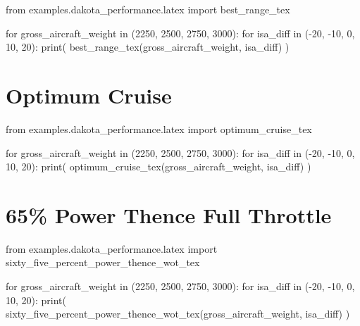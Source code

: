 \begin{pycode}
from examples.dakota_performance.latex import best_range_tex

for gross_aircraft_weight in (2250, 2500, 2750, 3000):
    for isa_diff in (-20, -10, 0, 10, 20):
        print(
            best_range_tex(gross_aircraft_weight, isa_diff)
        )
\end{pycode}

\section{Optimum Cruise}

\begin{pycode}
from examples.dakota_performance.latex import optimum_cruise_tex

for gross_aircraft_weight in (2250, 2500, 2750, 3000):
    for isa_diff in (-20, -10, 0, 10, 20):
        print(
            optimum_cruise_tex(gross_aircraft_weight, isa_diff)
        )
\end{pycode}

\section{65\% Power Thence Full Throttle}

\begin{pycode}
from examples.dakota_performance.latex import sixty_five_percent_power_thence_wot_tex

for gross_aircraft_weight in (2250, 2500, 2750, 3000):
    for isa_diff in (-20, -10, 0, 10, 20):
        print(
            sixty_five_percent_power_thence_wot_tex(gross_aircraft_weight, isa_diff)
        )
\end{pycode}
